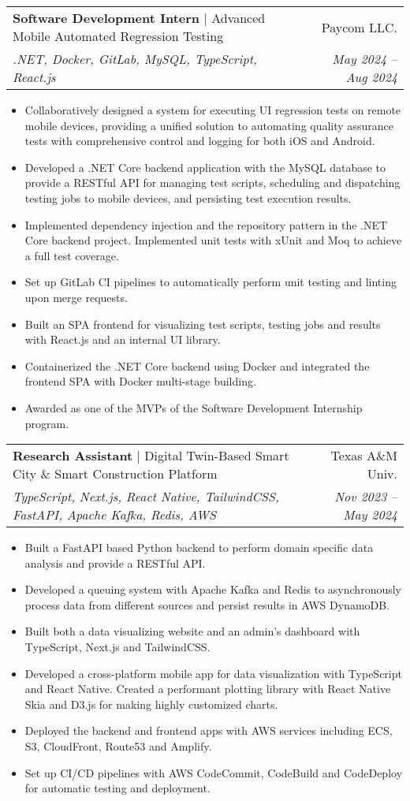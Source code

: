 \documentclass[letterpaper,11pt]{article}
\makeatletter
\newcommand{\mySecondaryItem}[1]{
  \item\raggedright\small{#1\vspace{-.5pt}}
}
\newcommand{\twoRowSubHeading}[5]{
  \item
  \begin{tabular*}{0.97\textwidth}{l@{\extracolsep{\fill}}r}
    \textbf{#1} | {#2} & {#3} \\
    \small{\textit{#4}} & \textit{\small{#5}} \\
  \end{tabular*}\vspace{-5pt}
}
\newcommand{\itemListStart}{\begin{itemize}[leftmargin=*]}
\newcommand{\itemListEnd}{\end{itemize}\vspace{-5pt}}
\makeatother
\begin{document}
\twoRowSubHeading
{Software Development Intern}
{Advanced Mobile Automated Regression Testing}
{Paycom LLC.}
{.NET, Docker, GitLab, MySQL, TypeScript, React.js}
{May 2024 -- Aug 2024}
\itemListStart
\mySecondaryItem{
  Collaboratively designed a system for executing UI regression tests on remote mobile devices, providing a unified solution to automating quality assurance tests with comprehensive control and logging for both iOS and Android.
}
\mySecondaryItem{
  Developed a .NET Core backend application with the MySQL database to provide a RESTful API for managing test scripts, scheduling and dispatching testing jobs to mobile devices, and persisting test execution results.
}
\mySecondaryItem{
  Implemented dependency injection and the repository pattern in the .NET Core backend project. Implemented unit tests with xUnit and Moq to achieve a full test coverage.
}
\mySecondaryItem{
  Set up GitLab CI pipelines to automatically perform unit testing and linting upon merge requests.
}
\mySecondaryItem{
  Built an SPA frontend for visualizing test scripts, testing jobs and results with React.js and an internal UI library.
}
\mySecondaryItem{
  Containerized the .NET Core backend using Docker and integrated the frontend SPA with Docker multi-stage building.
}
\mySecondaryItem{
  Awarded as one of the MVPs of the Software Development Internship program. 
}
\itemListEnd

\twoRowSubHeading
{Research Assistant}
{Digital Twin-Based Smart City \& Smart Construction Platform
}
{Texas A\&M Univ.}
{TypeScript, Next.js, React Native, TailwindCSS, FastAPI, Apache Kafka, Redis, AWS}
{Nov 2023 -- May 2024}
\itemListStart
\mySecondaryItem{
  Built a FastAPI based Python backend to perform domain specific data analysis and provide a RESTful API.
}
\mySecondaryItem{
  Developed a queuing system with Apache Kafka and Redis to asynchronously process data from different sources and persist results in AWS DynamoDB.
}
\mySecondaryItem{
  Built both a data visualizing website and an admin's dashboard with TypeScript, Next.js and TailwindCSS.
}
\mySecondaryItem{
  Developed a cross-platform mobile app for data visualization with TypeScript and React Native. Created a performant plotting library with React Native Skia and D3.js for making highly customized charts.
}
\mySecondaryItem{
  Deployed the backend and frontend apps with AWS services including ECS, S3, CloudFront, Route53 and Amplify.
}
\mySecondaryItem{
  Set up CI/CD pipelines with AWS CodeCommit, CodeBuild and CodeDeploy for automatic testing and deployment.
}
\itemListEnd
\end{document}
